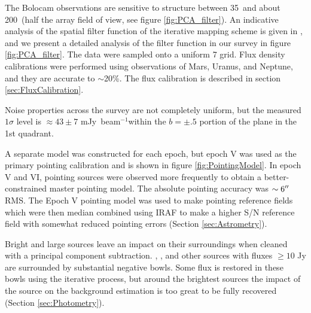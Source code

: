 \documentclass[12pt,preprint]{aastex}
\newcommand\jyb{Jy~beam$^{-1}$}
\begin{document}
The Bolocam observations are sensitive to structure between 35\arcsec\ and
about 200\arcsec\ (half the array field of view, see figure
\ref{fig:PCA_filter}).  An indicative analysis of the spatial filter function
of the iterative mapping scheme is given in \citet{enoch06}, and we present a detailed analysis
of the filter function in our survey in figure \ref{fig:PCA_filter}.  The data were
sampled onto a uniform 7 grid.  Flux density calibrations were performed
using observations of Mars, Uranus, and Neptune, and they are accurate to
$\sim$20\%.  The flux calibration is described in section \ref{sec:FluxCalibration}.

Noise properties across the survey are not completely uniform, but the
measured $1\sigma$ level is $\approx43\pm7$ m\jyb within the
$b=\pm.5$ portion of the plane in the 1st quadrant.

A separate model was constructed for each epoch, but epoch V was used as the
primary pointing calibration and is shown in figure \ref{fig:PointingModel}.
In epoch V and VI, pointing sources were observed more frequently to obtain a
better-constrained master pointing model. The absolute pointing accuracy was
$\sim6\mbox{$^{\prime\prime}$}$ RMS.  The Epoch V pointing model was used to make pointing
reference fields which were then median combined using IRAF to make a higher
S/N reference field with somewhat reduced pointing errors (Section
\ref{sec:Astrometry}).


Bright and large sources leave an impact on their surroundings when
cleaned with a principal component subtraction.  ,
, and other sources with fluxes $\geq 10$ Jy are
surrounded by substantial negative bowls.  Some flux is restored in
these bowls using the iterative process, 
 but around the brightest sources the impact of the source on the
background estimation is too great to be fully recovered (Section
\ref{sec:Photometry}).
\end{document}
